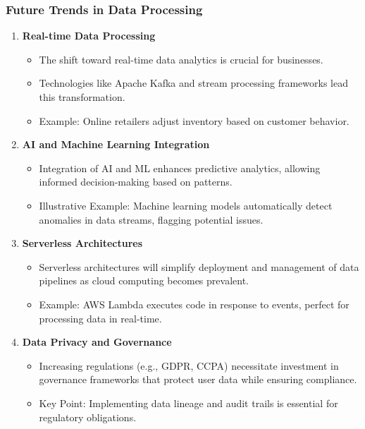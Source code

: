 \documentclass{beamer}
\begin{document}
\begin{frame}[fragile]
    \frametitle{Future Trends in Data Processing}
    \begin{enumerate}
        \item \textbf{Real-time Data Processing}
        \begin{itemize}
            \item The shift toward real-time data analytics is crucial for businesses.
            \item Technologies like Apache Kafka and stream processing frameworks lead this transformation.
            \item Example: Online retailers adjust inventory based on customer behavior.
        \end{itemize}
        
        \item \textbf{AI and Machine Learning Integration}
        \begin{itemize}
            \item Integration of AI and ML enhances predictive analytics, allowing informed decision-making based on patterns.
            \item Illustrative Example: Machine learning models automatically detect anomalies in data streams, flagging potential issues.
        \end{itemize}
        
        \item \textbf{Serverless Architectures}
        \begin{itemize}
            \item Serverless architectures will simplify deployment and management of data pipelines as cloud computing becomes prevalent.
            \item Example: AWS Lambda executes code in response to events, perfect for processing data in real-time.
        \end{itemize}
        
        \item \textbf{Data Privacy and Governance}
        \begin{itemize}
            \item Increasing regulations (e.g., GDPR, CCPA) necessitate investment in governance frameworks that protect user data while ensuring compliance.
            \item Key Point: Implementing data lineage and audit trails is essential for regulatory obligations.
        \end{itemize}
    \end{enumerate}
\end{frame}
\end{document}
